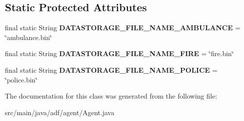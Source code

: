 \subsection*{Static Protected Attributes}
\begin{DoxyCompactItemize}
\item 
\hypertarget{classadf_1_1agent_1_1Agent_acd99fefd69e32605d1fc2924c96eead0}{}\label{classadf_1_1agent_1_1Agent_acd99fefd69e32605d1fc2924c96eead0} 
final static String {\bfseries D\+A\+T\+A\+S\+T\+O\+R\+A\+G\+E\+\_\+\+F\+I\+L\+E\+\_\+\+N\+A\+M\+E\+\_\+\+A\+M\+B\+U\+L\+A\+N\+CE} = \char`\"{}ambulance.\+bin\char`\"{}
\item 
\hypertarget{classadf_1_1agent_1_1Agent_a00421901d5b40dd510ff645de4ed6279}{}\label{classadf_1_1agent_1_1Agent_a00421901d5b40dd510ff645de4ed6279} 
final static String {\bfseries D\+A\+T\+A\+S\+T\+O\+R\+A\+G\+E\+\_\+\+F\+I\+L\+E\+\_\+\+N\+A\+M\+E\+\_\+\+F\+I\+RE} = \char`\"{}fire.\+bin\char`\"{}
\item 
\hypertarget{classadf_1_1agent_1_1Agent_adc72b242cd1a60a0f8274cbcb03728a3}{}\label{classadf_1_1agent_1_1Agent_adc72b242cd1a60a0f8274cbcb03728a3} 
final static String {\bfseries D\+A\+T\+A\+S\+T\+O\+R\+A\+G\+E\+\_\+\+F\+I\+L\+E\+\_\+\+N\+A\+M\+E\+\_\+\+P\+O\+L\+I\+CE} = \char`\"{}police.\+bin\char`\"{}
\end{DoxyCompactItemize}


The documentation for this class was generated from the following file\+:\begin{DoxyCompactItemize}
\item 
src/main/java/adf/agent/Agent.\+java\end{DoxyCompactItemize}
